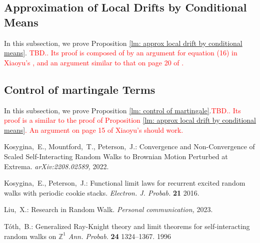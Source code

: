 \documentclass[twoside,12pt,a4paper]{article}
\numberwithin{equation}{section}
\newcommand\TBD{\textcolor{red}{TBD.}}
\begin{document}
\subsection{Approximation of Local Drifts by Conditional Means}
In this subsection, we prove Proposition \ref{lm: approx local drift by conditional means}. \textcolor{red}{\TBD. Its proof is composed of by an argument for equation (16) in Xiaoyu's \cite{L23}, and an argument similar to that on page 20 of \cite{KP16}.}

\subsection{Control of martingale Terms } 
In this subsection, we prove Proposition \ref{lm: control of martingale}.\textcolor{red}{\TBD. Its proof is a similar to the proof of Proposition \ref{lm: approx local drift by conditional means}. An argument on page 15 of Xiaoyu's \cite{L23} should work.}

\begin{thebibliography}{99} 
  Kosygina,~E., Mountford,~T., Peterson,~J.: Convergence and Non-Convergence of Scaled Self-Interacting Random Walks to Brownian Motion Perturbed at Extrema. \textit{arXiv:2208.02589,} 2022.
 
  Kosygina,~E., Peterson,~J.: Functional limit laws for recurrent excited random walks with
 periodic cookie stacks. \textit{Electron. J. Probab.} \textbf{21} 2016.

 Liu,~X.: Research in Random Walk. \textit{Personal communication,} 2023.

 T\'{o}th,~B.: Generalized Ray-Knight theory and limit theorems for self-interacting random walks on $\mathbb{Z}^1$ \textit{Ann. Probab.} \textbf{24} 1324--1367. 1996
\end{thebibliography}
\end{document}
